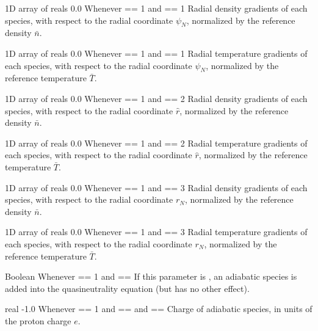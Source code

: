 {1D array of reals}
{0.0}
{Whenever  == 1 and  == 1}
{Radial density gradients of each species, with respect to the radial coordinate $\psi_N$, normalized by the reference density $\bar{n}$.}

\myhrule

{1D array of reals}
{0.0}
{Whenever  == 1 and  == 1}
{Radial temperature gradients of each species, with respect to the radial coordinate $\psi_N$, normalized by the reference temperature $\bar{T}$.}

\myhrule

{1D array of reals}
{0.0}
{Whenever  == 1 and  == 2}
{Radial density gradients of each species, with respect to the radial coordinate $\hat{r}$, normalized by the reference density $\bar{n}$.}

\myhrule

{1D array of reals}
{0.0}
{Whenever  == 1 and  == 2}
{Radial temperature gradients of each species, with respect to the radial coordinate $\hat{r}$, normalized by the reference temperature $\bar{T}$.}

\myhrule

{1D array of reals}
{0.0}
{Whenever  == 1 and  == 3}
{Radial density gradients of each species, with respect to the radial coordinate $r_N$, normalized by the reference density $\bar{n}$.}

\myhrule

{1D array of reals}
{0.0}
{Whenever  == 1 and  == 3}
{Radial temperature gradients of each species, with respect to the radial coordinate $r_N$, normalized by the reference temperature $\bar{T}$.}

\myhrule

{Boolean}
{\false}
{Whenever  == 1 and  == \true}
{If this parameter is \true, an adiabatic species is added into the quasineutrality equation (but has no other effect).}

\myhrule

{real}
{-1.0}
{Whenever  == 1 and  == \true and  == \true}
{Charge of adiabatic species, in units of the proton charge $e$.}


